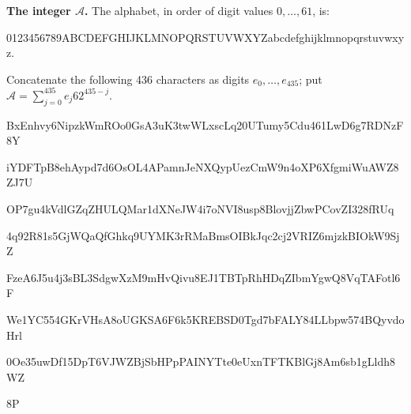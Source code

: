 \par\noindent\begin{minipage}{\linewidth}\raggedright
\textbf{The integer $\mathcal A$.}
The alphabet, in order of digit values $0,\ldots,61$, is:\par
{\fontsize{7.7}{8.2}\selectfont\ttfamily 0123456789ABCDEFGHIJKLMNOPQRSTUVWXYZabcdefghijklmnopqrstuvwxyz}.\par
Concatenate the following 436 characters as digits $e_0,\ldots,e_{435}$;
put $\mathcal A=\sum_{j=0}^{435}e_j62^{435-j}$.\par
\begingroup\fontsize{7.7}{8.2}\selectfont\ttfamily
BxEnhvy6NipzkWmROo0GsA3uK3twWLxscLq20UTumy5Cdu461LwD6g7RDNzF8Y\par
iYDFTpB8ehAypd7d6OsOL4APamnJeNXQypUezCmW9n4oXP6XfgmiWuAWZ8ZJ7U\par
OP7gu4kVdlGZqZHULQMar1dXNeJW4i7oNVI8usp8BlovjjZbwPCovZI328fRUq\par
4q92R81s5GjWQaQfGhkq9UYMK3rRMaBmsOIBkJqc2cj2VRIZ6mjzkBIOkW9SjZ\par
FzeA6J5u4j3sBL3SdgwXzM9mHvQivu8EJ1TBTpRhHDqZIbmYgwQ8VqTAFotl6F\par
We1YC554GKrVHsA8oUGKSA6F6k5KREBSD0Tgd7bFALY84LLbpw574BQyvdoHrl\par
0Oe35uwDf15DpT6VJWZBjSbHPpPAINYTte0eUxnTFTKBlGj8Am6sb1gLldh8WZ\par
8P\par
\endgroup

\end{minipage}\par
\endgroup
